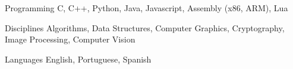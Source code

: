 

\begin{cvskills}

  \cvskill
    {Programming} %
    {C, C++, Python, Java, Javascript, Assembly (x86, ARM), Lua} %

  \cvskill
    {Disciplines} %
    {Algorithms, Data Structures, Computer Graphics, Cryptography, Image Processing, Computer Vision} %

  \cvskill
    {Languages} %
    {English, Portuguese, Spanish} %

\end{cvskills}
